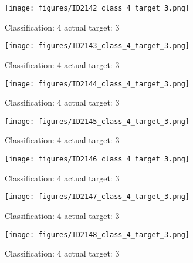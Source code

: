 \begin{figure}[h!]
\begin{center}
\texttt{[image: figures/ID2142\_class\_4\_target\_3.png]}
\end{center}
\caption{ Classification: 4 actual target: 3}
\label{fig:ID2142_class_4_target_3}
\end{figure}
\begin{figure}[h!]
\begin{center}
\texttt{[image: figures/ID2143\_class\_4\_target\_3.png]}
\end{center}
\caption{ Classification: 4 actual target: 3}
\label{fig:ID2143_class_4_target_3}
\end{figure}
\begin{figure}[h!]
\begin{center}
\texttt{[image: figures/ID2144\_class\_4\_target\_3.png]}
\end{center}
\caption{ Classification: 4 actual target: 3}
\label{fig:ID2144_class_4_target_3}
\end{figure}
\begin{figure}[h!]
\begin{center}
\texttt{[image: figures/ID2145\_class\_4\_target\_3.png]}
\end{center}
\caption{ Classification: 4 actual target: 3}
\label{fig:ID2145_class_4_target_3}
\end{figure}
\begin{figure}[h!]
\begin{center}
\texttt{[image: figures/ID2146\_class\_4\_target\_3.png]}
\end{center}
\caption{ Classification: 4 actual target: 3}
\label{fig:ID2146_class_4_target_3}
\end{figure}
\begin{figure}[h!]
\begin{center}
\texttt{[image: figures/ID2147\_class\_4\_target\_3.png]}
\end{center}
\caption{ Classification: 4 actual target: 3}
\label{fig:ID2147_class_4_target_3}
\end{figure}
\begin{figure}[h!]
\begin{center}
\texttt{[image: figures/ID2148\_class\_4\_target\_3.png]}
\end{center}
\caption{ Classification: 4 actual target: 3}
\label{fig:ID2148_class_4_target_3}
\end{figure}
